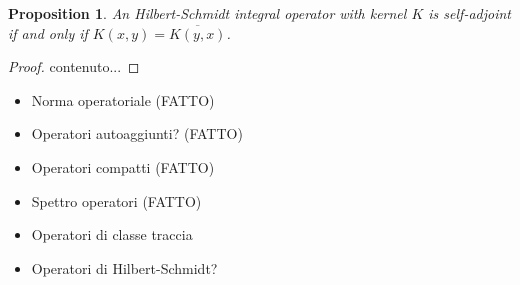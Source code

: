 \documentclass[corpo=11pt, stile=classica, tipotesi=custom,
greek, evenboxes, english]{toptesi}
\numberwithin{equation}{chapter}
\newtheorem{prop}[teo]{Proposition}
\begin{document}
\begin{prop}\label{condition integral operator self-adjoint}
	An Hilbert-Schmidt integral operator with kernel $K$ is self-adjoint if and only if $K(x,y) = \overline{K(y,x)}$.
\end{prop}
\begin{proof}
	contenuto...
\end{proof}


\begin{itemize}
	\item Norma operatoriale (FATTO)
	\item Operatori autoaggiunti? (FATTO)
	\item Operatori compatti (FATTO)
	\item Spettro operatori (FATTO)
	\item Operatori di classe traccia
	\item Operatori di Hilbert-Schmidt?
\end{itemize}
\end{document}
